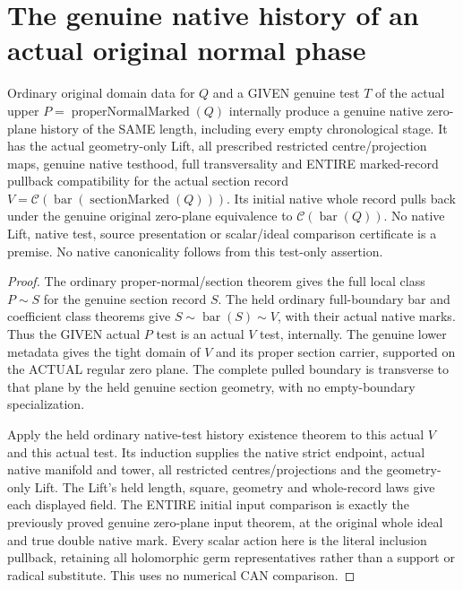 \section{The genuine native history of an actual original normal phase}

\begin{theorem}
\label{hir:g1-proper-normal-upper-native-test}
\leanok
Ordinary original domain data for $Q$ and a GIVEN genuine test $T$
of the actual upper $P=\operatorname{properNormalMarked}(Q)$ internally
produce a genuine native zero-plane history of the SAME length,
including every empty chronological stage. It has the actual
geometry-only Lift, all prescribed restricted centre/projection
maps, genuine native testhood, full transversality and ENTIRE
marked-record pullback compatibility for the actual section record
$V=\mathcal C(\operatorname{bar}(\operatorname{sectionMarked}(Q)))$.
Its initial native whole record pulls back under the genuine original
zero-plane equivalence to $\mathcal C(\operatorname{bar}(Q))$.
No native Lift, native test, source presentation or scalar/ideal
comparison certificate is a premise. No native canonicality follows
from this test-only assertion.
\end{theorem}
\begin{proof}
The ordinary proper-normal/section theorem gives the full local
class $P\sim S$ for the genuine section record $S$. The held
ordinary full-boundary bar and coefficient class theorems give
$S\sim\operatorname{bar}(S)\sim V$, with their actual native marks.
Thus the GIVEN actual $P$ test is an actual $V$ test, internally.
The genuine lower metadata gives the tight domain of $V$ and its
proper section carrier, supported on the ACTUAL regular zero plane.
The complete pulled boundary is transverse to that plane by the
held genuine section geometry, with no empty-boundary specialization.

Apply the held ordinary native-test history existence theorem to
this actual $V$ and this actual test. Its induction supplies the
native strict endpoint, actual native manifold and tower, all
restricted centres/projections and the geometry-only Lift. The
Lift's held length, square, geometry and whole-record laws give
each displayed field. The ENTIRE initial input comparison is
exactly the previously proved genuine zero-plane input theorem,
at the original whole ideal and true double native mark. Every
scalar action here is the literal inclusion pullback, retaining
all holomorphic germ representatives rather than a support or
radical substitute. This uses no numerical CAN comparison.
\end{proof}

